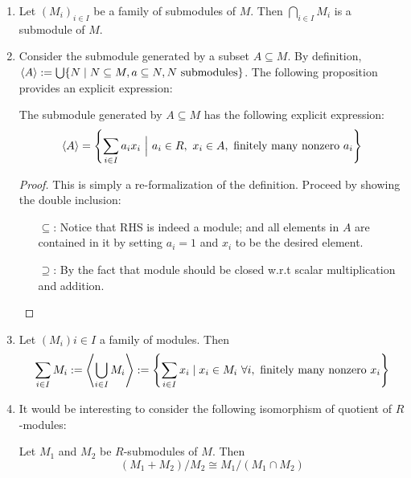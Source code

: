 \documentclass{article}
\begin{document}
\begin{enumerate}
    \item Let $(M_i)_{i\in I}$ be a family of submodules of $M$. Then $\bigcap_{i\in I} M_i$ is a submodule of $M$. 
    \item Consider the submodule generated by a subset $A \subseteq M$. By definition, $\left\langle A \right\rangle := \bigcup\{N \mid N\subseteq M, a\subseteq N, N \text{ submodules}\}$. The following proposition provides an explicit expression:
        \begin{proposition}\label{prop:Explicit Expression of Generated Submodules}
            The submodule generated by $A\subseteq M$ has the following explicit expression:
            \[
                \pair{A} = \left\{ \sum\limits_{i\in I} a_i x_i\ \Big|\ a_i \in R,\ x_i\in A, \text{ finitely many nonzero } a_i \right\}
            \]
        \end{proposition}

        \begin{proof}
            This is simply a re-formalization of the definition. Proceed by showing the double inclusion:
            \begin{itemize}
                \item[$\subseteq$:] Notice that RHS is indeed a module; and all elements in $A$ are contained in it by setting $a_i = 1$ and $x_i$ to be the desired element.
                \item[$\supseteq$:] By the fact that module should be closed w.r.t scalar multiplication and addition.
            \end{itemize}
        \end{proof}
    \item Let $(M_i)i\in I$ a family of modules. Then
        \[
            \sum\limits_{i\in I} M_i := \left\langle \bigcup_{i\in I} M_i \right\rangle := \left\{ \sum\limits_{i\in I} x_i \mid x_i\in M_i\ \forall i, \text{ finitely many nonzero } x_i \right\}
        \]
    \item It would be interesting to consider the following isomorphism of quotient of $R$-modules:
        \begin{theorem}\label{thm:Third Isomorphism Theorem}
            Let $M_1$ and $M_2$ be $R$-submodules of $M$. Then 
            \[
                (M_1 + M_2)/M_2 \cong M_1/(M_1 \cap M_2)  
            \]
         \end{theorem}


\end{enumerate}
\end{document}
